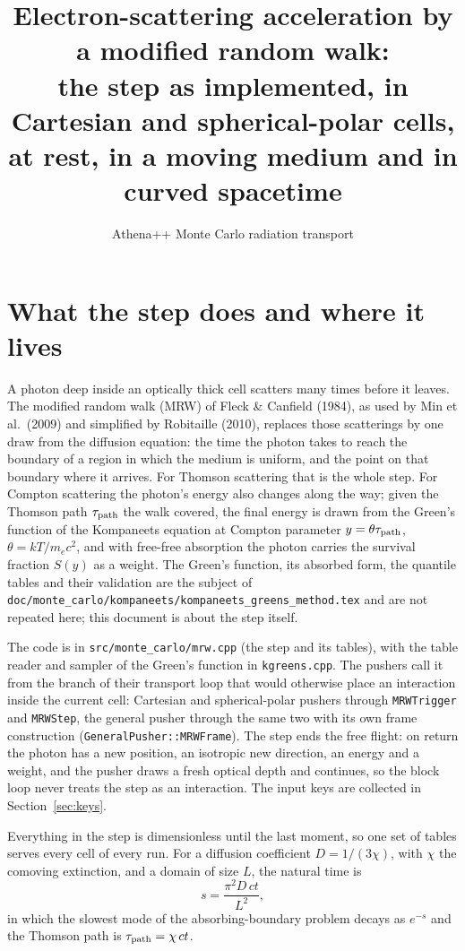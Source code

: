 \documentclass[11pt]{article}
\title{Electron-scattering acceleration by a modified random walk:\\
the step as implemented, in Cartesian and spherical-polar cells, at rest, in a moving
medium and in curved spacetime}
\author{Athena++ Monte Carlo radiation transport}
\date{}
\begin{document}
\sloppy
\maketitle

\section{What the step does and where it lives}

A photon deep inside an optically thick cell scatters many times before it leaves.
The modified random walk (MRW) of Fleck \& Canfield (1984), as used by Min et al.\
(2009) and simplified by Robitaille (2010), replaces those scatterings by one draw from
the diffusion equation: the time the photon takes to reach the boundary of a region in
which the medium is uniform, and the point on that boundary where it arrives.  For
Thomson scattering that is the whole step.  For Compton scattering the photon's energy
also changes along the way; given the Thomson path $\tau_{\rm path}$ the walk covered,
the final energy is drawn from the Green's function of the Kompaneets equation at
Compton parameter $y=\theta\tau_{\rm path}$, $\theta=kT/m_ec^2$, and with free-free
absorption the photon carries the survival fraction $S(y)$ as a weight.  The Green's
function, its absorbed form, the quantile tables and their validation are the subject
of \texttt{doc/monte\-\_carlo/kompaneets/kompaneets\_greens\_method.tex} and are not
repeated here; this document is about the step itself.

The code is in \texttt{src/monte\_carlo/mrw.cpp} (the step and its tables), with the
table reader and sampler of the Green's function in \texttt{kgreens.cpp}.  The pushers
call it from the branch of their transport loop that would otherwise place an
interaction inside the current cell: Cartesian and spherical-polar pushers through
\texttt{MRWTrigger} and \texttt{MRWStep}, the general pusher through the same two with
its own frame construction (\texttt{GeneralPusher::MRWFrame}).  The step ends the free
flight: on return the photon has a new position, an isotropic new direction, an energy
and a weight, and the pusher draws a fresh optical depth and continues, so the block
loop never treats the step as an interaction.  The input keys are collected in
Section~\ref{sec:keys}.

Everything in the step is dimensionless until the last moment, so one set of tables
serves every cell of every run.  For a diffusion coefficient $D=1/(3\chi)$, with $\chi$
the comoving extinction, and a domain of size $L$, the natural time is
\begin{equation}
  s=\frac{\pi^2 D\,ct}{L^2},
\end{equation}
in which the slowest mode of the absorbing-boundary problem decays as $e^{-s}$ and the
Thomson path is $\tau_{\rm path}=\chi\,ct$.
\end{document}
